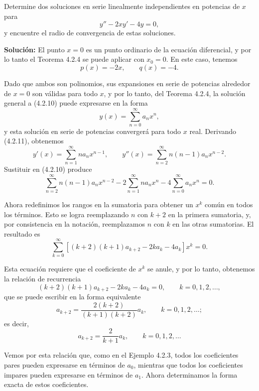 \begin{example}
  Determine dos soluciones en serie linealmente independientes en potencias de $x$ para
\begin{equation} \tag{4.2.10}
y'' - 2xy' - 4y = 0,
\end{equation}
y encuentre el radio de convergencia de estas soluciones.

\noindent \textbf{Solución:} \quad El punto $x = 0$ es un punto ordinario de la ecuación diferencial, y por lo tanto el Teorema 4.2.4 se puede aplicar con $x_0 = 0$. En este caso, tenemos
\[ p(x) = -2x, \qquad q(x) = -4. \]

Dado que ambos son polinomios, sus expansiones en serie de potencias alrededor de $x = 0$ son válidas para todo $x$, y por lo tanto, del Teorema 4.2.4, la solución general a (4.2.10) puede expresarse en la forma
\begin{equation} \tag{4.2.11}
y(x) = \sum_{n=0}^{\infty} a_n x^n,
\end{equation}
y esta solución en serie de potencias convergerá para todo $x$ real. Derivando (4.2.11), obtenemos
\[ y'(x) = \sum_{n=1}^{\infty} n a_n x^{n-1}, \qquad y''(x) = \sum_{n=2}^{\infty} n(n-1)a_n x^{n-2}. \]
Sustituir en (4.2.10) produce
\[ \sum_{n=2}^{\infty} n(n-1)a_n x^{n-2} - 2\sum_{n=1}^{\infty} n a_n x^n - 4\sum_{n=0}^{\infty} a_n x^n = 0. \]

Ahora redefinimos los rangos en la sumatoria para obtener un $x^k$ común en todos los términos. Esto se logra reemplazando $n$ con $k + 2$ en la primera sumatoria, y, por consistencia en la notación, reemplazamos $n$ con $k$ en las otras sumatorias. El resultado es
\[ \sum_{k=0}^{\infty} [(k+2)(k+1)a_{k+2} - 2ka_k - 4a_k]x^k = 0. \]

Esta ecuación requiere que el coeficiente de $x^k$ se anule, y por lo tanto, obtenemos la relación de recurrencia
\[ (k+2)(k+1)a_{k+2} - 2ka_k - 4a_k = 0, \qquad k = 0, 1, 2, \dots, \]
que se puede escribir en la forma equivalente
\[ a_{k+2} = \frac{2(k+2)}{(k+1)(k+2)}a_k, \qquad k = 0, 1, 2, \dots; \]
es decir,
\begin{equation} \tag{4.2.12}
a_{k+2} = \frac{2}{k+1}a_k, \qquad k = 0, 1, 2, \dots
\end{equation}

Vemos por esta relación que, como en el Ejemplo 4.2.3, todos los coeficientes pares pueden expresarse en términos de $a_0$, mientras que todos los coeficientes impares pueden expresarse en términos de $a_1$. Ahora determinamos la forma exacta de estos coeficientes.


\end{example}
